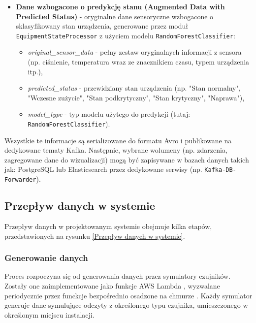 \begin{itemize}
    \item \textbf{Dane wzbogacone o predykcję stanu (Augmented Data with Predicted Status)} - oryginalne dane sensoryczne wzbogacone o sklasyfikowany stan urządzenia, generowane przez moduł \texttt{EquipmentStateProcessor} z użyciem modelu \texttt{RandomForestClassifier}:
    \begin{itemize}
        \item \textit{original\_sensor\_data} - pełny zestaw oryginalnych informacji z sensora (np. ciśnienie, temperatura wraz ze znacznikiem czasu, typem urządzenia itp.),
        \item \textit{predicted\_status} - przewidziany stan urządzenia (np. "Stan normalny", "Wczesne zużycie", "Stan podkrytyczny", "Stan krytyczny", "Naprawa"),
        \item \textit{model\_type} - typ modelu użytego do predykcji (tutaj: \texttt{RandomForestClassifier}).
    \end{itemize}
\end{itemize}

Wszystkie te informacje są serializowane do formatu Avro i publikowane na dedykowane tematy Kafka. Następnie, wybrane wolumeny (np. zdarzenia, zagregowane dane do wizualizacji) mogą być zapisywane w bazach danych takich jak: PostgreSQL lub Elasticsearch przez dedykowane serwisy (np. \texttt{Kafka-DB-Forwarder}).

\newpage

\subsection{Przepływ danych w systemie}
\label{subsec:przeplyw_danych}

Przepływ danych w projektowanym systemie obejmuje kilka etapów, przedstawionych na rysunku \ref{Przepływ danych w systemie}.


\subsubsection{Generowanie danych}
\label{subsubsec:generowanie_danych}

Proces rozpoczyna się od generowania danych przez symulatory czujników. Zostały one zaimplementowane jako funkcje AWS Lambda \cite{aws_lambda_docs},
wyzwalane periodycznie przez funckcje bezpośrednio osadzone na chmurze  \cite{aws_step_functions_docs}.
Każdy symulator generuje dane symulujące odczyty z określonego typu czujnika,
umieszczonego w określonym miejscu instalacji.

